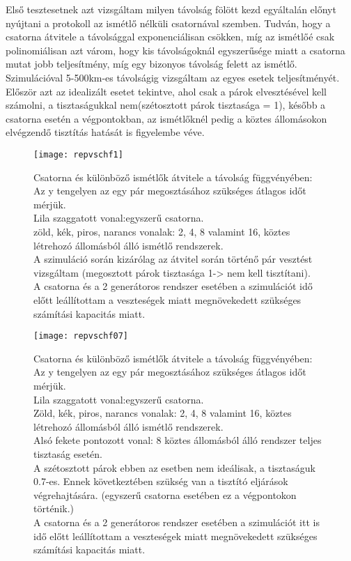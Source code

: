 Első tesztesetnek azt vizsgáltam milyen távolság fölött kezd egyáltalán előnyt nyújtani a protokoll az ismétlő nélküli csatornával szemben. Tudván, hogy a csatorna átvitele a távolsággal exponenciálisan csökken, míg az ismétlőé csak polinomiálisan \cite{briegel1998quantum} azt várom, hogy kis távolságoknál egyszerűsége miatt a csatorna mutat jobb teljesítmény, míg egy bizonyos távolság felett az ismétlő. Szimulációval 5-500km-es távolságig vizsgáltam az egyes esetek teljesítményét. Először azt az idealizált esetet tekintve, ahol csak a párok elvesztésével kell számolni, a tisztaságukkal nem(szétosztott párok tisztasága = 1), később a csatorna esetén a végpontokban, az ismétlőknél pedig a köztes állomásokon elvégzendő tisztítás hatását is figyelembe véve.
\begin{figure}[H]
\centering
\texttt{[image: repvschf1]}
\caption[Csatorna és ismétlők karakterisztikája 1]
{Csatorna és különböző ismétlők átvitele a távolság függvényében:\\
Az y tengelyen az egy pár megosztásához szükséges átlagos időt mérjük.\\
Lila szaggatott vonal:egyszerű csatorna.\\
zöld, kék, piros, narancs vonalak: 2, 4, 8 valamint 16, köztes létrehozó állomásból álló ismétlő rendszerek.\\
A szimuláció során kizárólag az átvitel során történő pár vesztést vizsgáltam (megosztott párok tisztasága 1-> nem kell tisztítani).\\
A csatorna és a 2 generátoros rendszer esetében a szimulációt idő előtt leállítottam a veszteségek miatt megnövekedett szükséges számítási kapacitás miatt.
}
\end{figure}
\begin{figure}[H]
\centering
\texttt{[image: repvschf07]}
\caption[Csatorna és ismétlők karakterisztikája 2]
{Csatorna és különböző ismétlők átvitele a távolság függvényében:\\
Az y tengelyen az egy pár megosztásához szükséges átlagos időt mérjük.\\
Lila szaggatott vonal:egyszerű csatorna.\\
Zöld, kék, piros, narancs vonalak: 2, 4, 8 valamint 16, köztes létrehozó állomásból álló ismétlő rendszerek.\\
Alsó fekete pontozott vonal: 8 köztes állomásból álló rendszer teljes tisztaság esetén.\\
A szétosztott párok ebben az esetben nem ideálisak, a tisztaságuk 0.7-es. Ennek következtében szükség van a tisztító eljárások végrehajtására. (egyszerű csatorna esetében ez a végpontokon történik.)\\
A csatorna és a 2 generátoros rendszer esetében a szimulációt itt is idő előtt leállítottam a veszteségek miatt megnövekedett szükséges számítási kapacitás miatt.
}
\end{figure}
